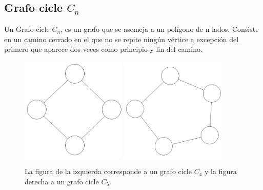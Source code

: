 \subsection{Grafo cicle $C_n$}
Un Grafo cicle $C_n$, es un grafo que se asemeja a un polígono de n lados. Consiste en un camino cerrado en el que no se repite ningún vértice a excepción del primero que aparece dos veces como principio y fin del camino. 

\begin{figure}[H]
\centering
\includegraphics[width=50mm]{C_4.png}
\includegraphics[width=50mm]{C_5.png}
\caption{La figura de la izquierda corresponde a un grafo cicle $C_4$ y la figura derecha a un grafo cicle $C_5$.}
\label{overflow}
\end{figure}
